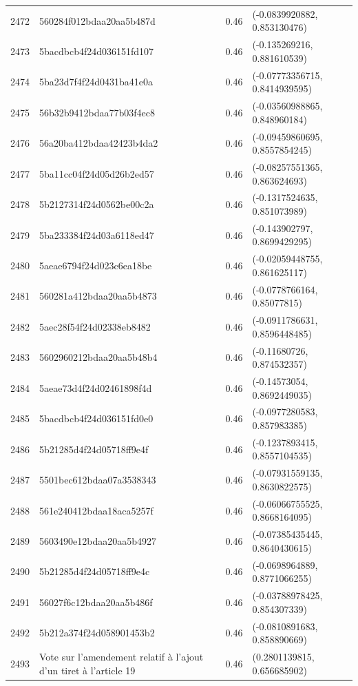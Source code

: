 \begin{table}[ht]
\begin{tabular}{rlrl}
  2472 & 560284f012bdaa20aa5b487d & 0.46 & (-0.0839920882, 0.853130476) \\ 
  2473 & 5bacdbcb4f24d036151fd107 & 0.46 & (-0.135269216, 0.881610539) \\ 
  2474 & 5ba23d7f4f24d0431ba41e0a & 0.46 & (-0.07773356715, 0.8414939595) \\ 
  2475 & 56b32b9412bdaa77b03f4ec8 & 0.46 & (-0.03560988865, 0.848960184) \\ 
  2476 & 56a20ba412bdaa42423b4da2 & 0.46 & (-0.09459860695, 0.8557854245) \\ 
  2477 & 5ba11cc04f24d05d26b2ed57 & 0.46 & (-0.08257551365, 0.863624693) \\ 
  2478 & 5b2127314f24d0562be00c2a & 0.46 & (-0.1317524635, 0.851073989) \\ 
  2479 & 5ba233384f24d03a6118ed47 & 0.46 & (-0.143902797, 0.8699429295) \\ 
  2480 & 5aeae6794f24d023c6ea18be & 0.46 & (-0.02059448755, 0.861625117) \\ 
  2481 & 560281a412bdaa20aa5b4873 & 0.46 & (-0.0778766164, 0.85077815) \\ 
  2482 & 5aec28f54f24d02338eb8482 & 0.46 & (-0.0911786631, 0.8596448485) \\ 
  2483 & 5602960212bdaa20aa5b48b4 & 0.46 & (-0.11680726, 0.874532357) \\ 
  2484 & 5aeae73d4f24d02461898f4d & 0.46 & (-0.14573054, 0.8692449035) \\ 
  2485 & 5bacdbcb4f24d036151fd0e0 & 0.46 & (-0.0977280583, 0.857983385) \\ 
  2486 & 5b21285d4f24d05718ff9e4f & 0.46 & (-0.1237893415, 0.8557104535) \\ 
  2487 & 5501bec612bdaa07a3538343 & 0.46 & (-0.07931559135, 0.8630822575) \\ 
  2488 & 561e240412bdaa18aca5257f & 0.46 & (-0.06066755525, 0.8668164095) \\ 
  2489 & 5603490e12bdaa20aa5b4927 & 0.46 & (-0.07385435445, 0.8640430615) \\ 
  2490 & 5b21285d4f24d05718ff9e4c & 0.46 & (-0.0698964889, 0.8771066255) \\ 
  2491 & 56027f6c12bdaa20aa5b486f & 0.46 & (-0.03788978425, 0.854307339) \\ 
  2492 & 5b212a374f24d058901453b2 & 0.46 & (-0.0810891683, 0.858890669) \\ 
  2493 & Vote sur l'amendement relatif à l'ajout d'un tiret à l'article 19 & 0.46 & (0.2801139815, 0.656685902) \\ 

\end{tabular}
\end{table}
